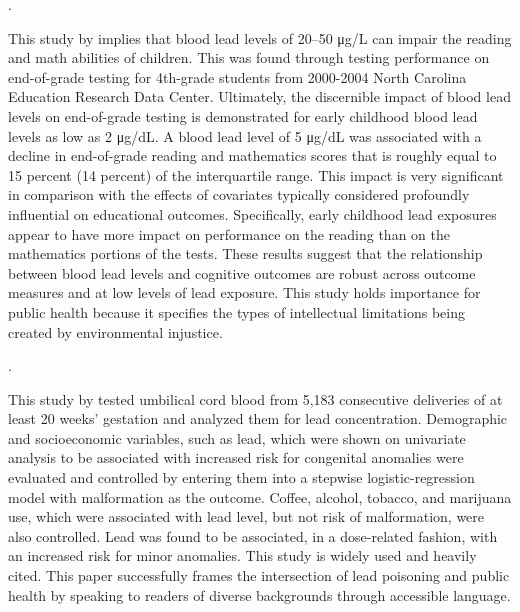 \documentclass{article}
\begin{document}
\medskip

\noindent {}. 

\medskip

This study by \cite{miranda2007} implies that blood lead levels of 20–50 μg/L can impair the reading and math abilities of children. This was found through testing performance on end-of-grade testing for 4th-grade students from 2000-2004 North Carolina Education Research Data Center. Ultimately, the discernible impact of blood lead levels on end-of-grade testing is demonstrated for early childhood blood lead levels as low as 2 μg/dL. A blood lead level of 5 μg/dL was associated with a decline in end-of-grade reading and mathematics scores that is roughly equal to 15 percent (14 percent) of the interquartile range. This impact is very significant in comparison with the effects of covariates typically considered profoundly influential on educational outcomes. Specifically, early childhood lead exposures appear to have more impact on performance on the reading than on the mathematics portions of the tests. These results suggest that the relationship between blood lead levels and cognitive outcomes are robust across outcome measures and at low levels of lead exposure. This study holds importance for public health because it specifies the types of intellectual limitations being created by environmental injustice. 

\medskip

\noindent {}. 

\medskip

This study by \cite{needleman_1984} tested umbilical cord blood from 5,183 consecutive deliveries of at least 20 weeks' gestation and analyzed them for lead concentration. Demographic and socioeconomic variables, such as lead, which were shown on univariate analysis to be associated with increased risk for congenital anomalies were evaluated and controlled by entering them into a stepwise logistic-regression model with malformation as the outcome. Coffee, alcohol, tobacco, and marijuana use, which were associated with lead level, but not risk of malformation, were also controlled. Lead was found to be associated, in a dose-related fashion, with an increased risk for minor anomalies. This study is widely used and heavily cited. This paper successfully frames the intersection of lead poisoning and public health by speaking to readers of diverse backgrounds through accessible language.

\medskip
\end{document}
